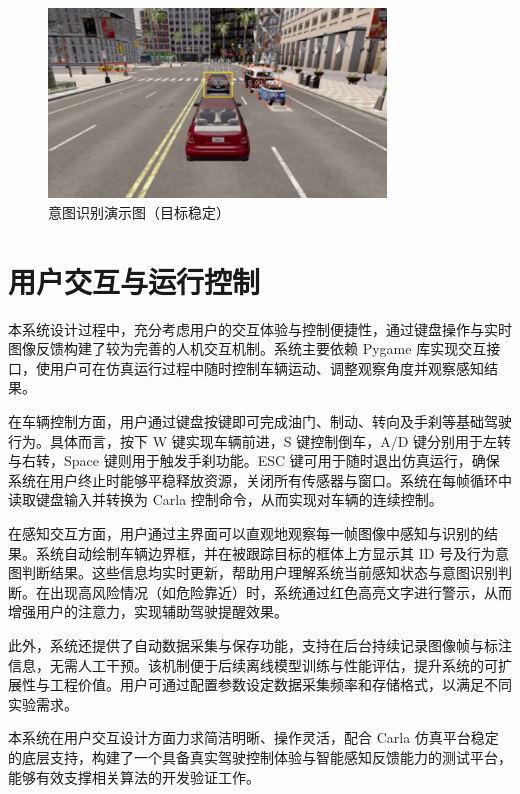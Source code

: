 \begin{figure}[H]
    \centering
    \includegraphics[width=0.8\textwidth]{images/图15 意图识别演示图（目标稳定）.pdf}  %
    \caption{意图识别演示图（目标稳定）}
    \label{fig:example_image}  %
\end{figure}

\section{用户交互与运行控制}

本系统设计过程中，充分考虑用户的交互体验与控制便捷性，通过键盘操作与实时图像反馈构建了较为完善的人机交互机制。系统主要依赖 Pygame 库实现交互接口，使用户可在仿真运行过程中随时控制车辆运动、调整观察角度并观察感知结果。

在车辆控制方面，用户通过键盘按键即可完成油门、制动、转向及手刹等基础驾驶行为。具体而言，按下 W 键实现车辆前进，S 键控制倒车，A/D 键分别用于左转与右转，Space 键则用于触发手刹功能。ESC 键可用于随时退出仿真运行，确保系统在用户终止时能够平稳释放资源，关闭所有传感器与窗口。系统在每帧循环中读取键盘输入并转换为 Carla 控制命令，从而实现对车辆的连续控制。

在感知交互方面，用户通过主界面可以直观地观察每一帧图像中感知与识别的结果。系统自动绘制车辆边界框，并在被跟踪目标的框体上方显示其 ID 号及行为意图判断结果。这些信息均实时更新，帮助用户理解系统当前感知状态与意图识别判断。在出现高风险情况（如危险靠近）时，系统通过红色高亮文字进行警示，从而增强用户的注意力，实现辅助驾驶提醒效果。

此外，系统还提供了自动数据采集与保存功能，支持在后台持续记录图像帧与标注信息，无需人工干预。该机制便于后续离线模型训练与性能评估，提升系统的可扩展性与工程价值。用户可通过配置参数设定数据采集频率和存储格式，以满足不同实验需求。

本系统在用户交互设计方面力求简洁明晰、操作灵活，配合 Carla 仿真平台稳定的底层支持，构建了一个具备真实驾驶控制体验与智能感知反馈能力的测试平台，能够有效支撑相关算法的开发验证工作。

